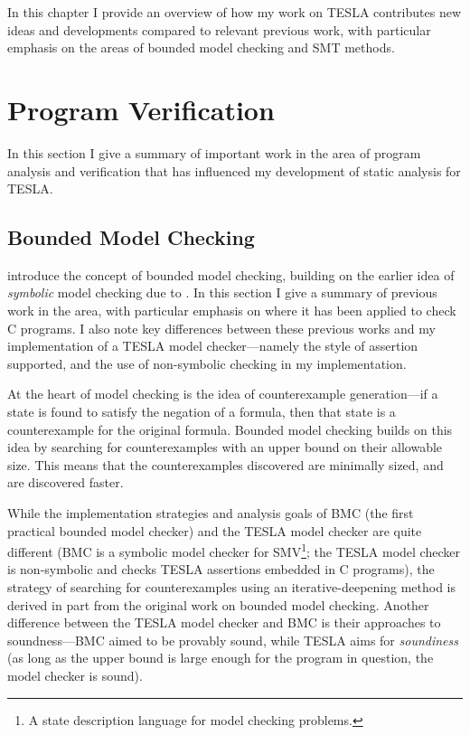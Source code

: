 In this chapter I provide an overview of how my work on TESLA contributes new
ideas and developments compared to relevant previous work, with particular
emphasis on the areas of bounded model checking and SMT methods.

\section{Program Verification} \label{sec:bounded-model-checking}

In this section I give a summary of important work in the area of program
analysis and verification that has influenced my development of static analysis
for TESLA.

\subsection{Bounded Model Checking}

\textcite{biere_symbolic_1999} introduce the concept of bounded model checking,
building on the earlier idea of \emph{symbolic} model checking due to
\textcite{mcmillan_symbolic_1992}. In this section I give a summary of previous
work in the area, with particular emphasis on where it has been applied to check
C programs. I also note key differences between these previous works and my
implementation of a TESLA model checker---namely the style of assertion
supported, and the use of non-symbolic checking in my implementation.

At the heart of model checking is the idea of counterexample generation---if a
state is found to satisfy the negation of a formula, then that state is a
counterexample for the original formula. Bounded model checking builds on this
idea by searching for counterexamples with an upper bound on their allowable
size. This means that the counterexamples discovered are minimally sized, and
are discovered faster.

While the implementation strategies and analysis goals of BMC
\cite{biere_symbolic_1999} (the first practical bounded model checker) and the
TESLA model checker are quite different (BMC is a symbolic model checker for
SMV\footnote{A state description language for model checking problems.}; the
TESLA model checker is non-symbolic and checks TESLA assertions embedded in C
programs), the strategy of searching for counterexamples using an
iterative-deepening method is derived in part from the original work on bounded
model checking. Another difference between the TESLA model checker and BMC is
their approaches to soundness---BMC aimed to be provably sound, while TESLA aims
for \emph{soundiness} \cite{livshits_defense_2015} (as long as the upper bound
is large enough for the program in question, the model checker is sound).

